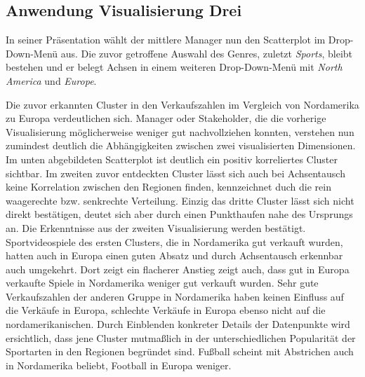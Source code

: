 \documentclass[usegeometry=true]{scrartcl}
\begin{document}
\subsection{Anwendung Visualisierung Drei}
In seiner Präsentation wählt der mittlere Manager nun den Scatterplot im Drop-Down-Menü aus.
Die zuvor getroffene Auswahl des Genres, zuletzt \textit{Sports}, bleibt bestehen und 
er belegt Achsen in einem weiteren Drop-Down-Menü mit \textit{North America} und \textit{Europe}.

Die zuvor erkannten Cluster in den Verkaufszahlen im Vergleich von Nordamerika zu Europa verdeutlichen sich. 
Manager oder Stakeholder, die die vorherige Visualisierung möglicherweise weniger gut nachvollziehen konnten, verstehen nun zumindest deutlich die Abhängigkeiten zwischen zwei visualisierten Dimensionen. 
Im unten abgebildeten Scatterplot ist deutlich ein positiv korreliertes Cluster sichtbar. 
Im zweiten zuvor entdeckten Cluster lässt sich auch bei Achsentausch keine Korrelation zwischen den Regionen finden, kennzeichnet duch die rein waagerechte bzw. senkrechte Verteilung.
Einzig das dritte Cluster lässt sich nicht direkt bestätigen, deutet sich aber durch einen Punkthaufen nahe des Ursprungs an.
Die Erkenntnisse aus der zweiten Visualisierung werden bestätigt. 
Sportvideospiele des ersten Clusters, die in Nordamerika gut verkauft wurden, hatten auch in Europa einen guten Absatz und durch Achsentausch erkennbar auch umgekehrt.
Dort zeigt ein flacherer Anstieg zeigt auch, dass gut in Europa verkaufte Spiele in Nordamerika weniger gut verkauft wurden. 
Sehr gute Verkaufszahlen der anderen Gruppe in Nordamerika haben keinen Einfluss auf die Verkäufe in Europa, schlechte Verkäufe in Europa ebenso nicht auf die nordamerikanischen. 
Durch Einblenden konkreter Details der Datenpunkte wird ersichtlich, dass jene Cluster mutmaßlich in der unterschiedlichen Popularität der Sportarten in den Regionen begründet sind. 
Fußball scheint mit Abstrichen auch in Nordamerika beliebt, Football in Europa weniger.

\end{document}
